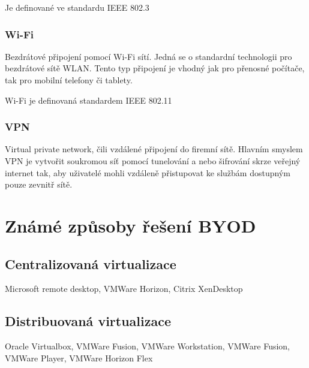  Je definované ve standardu IEEE 802.3 
 
 \subsubsection{Wi-Fi} 
 
 Bezdrátové připojení pomocí Wi-Fi sítí. Jedná se o standardní technologii pro bezdrátové sítě WLAN. Tento typ připojení je vhodný jak pro přenosné počítače, tak pro mobilní telefony či tablety.
 
 Wi-Fi je definovaná standardem IEEE 802.11
 
 \subsubsection{VPN} 
 Virtual private network, čili vzdálené připojení do firemní sítě. Hlavním smyslem VPN je vytvořit soukromou síť pomocí tunelování a nebo šifrování skrze veřejný internet tak, aby uživatelé mohli vzdáleně přistupovat ke službám dostupným pouze zevnitř sítě.
 
 
 
 
 
 \section{Známé způsoby řešení BYOD}

 
 \subsection{Centralizovaná virtualizace}
 Microsoft remote desktop, VMWare Horizon, Citrix XenDesktop
 
 
 \subsection{Distribuovaná virtualizace}
 Oracle Virtualbox, VMWare Fusion, VMWare Workstation, VMWare Fusion, VMWare Player, VMWare Horizon Flex
 

